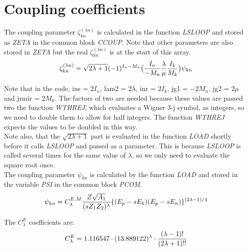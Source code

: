 \chapter{Coupling coefficients}
\label{chapt:coupling}

The coupling parameter $\zeta_{kn}^{(\lambda n)}$ is calculated in the
function \emph{LSLOOP} and stored as \emph{ZETA} in the common block \emph{
CCOUP}. Note that other parameters are also stored in \emph{ZETA} but the
real $\zeta_{kn}^{(\lambda n)}$ is at the start of this array.\\

\begin{equation}
\zeta_{kn}^{(\lambda n)} =
\sqrt{2 \lambda + 1}
(-1)^{I_n - M_n}
\big({I_n \over -M_n} {\lambda \over \mu} {I_k \over M_k}\big)
\psi_{kn}
\end{equation}

Note that in the code, ins = $2I_n$, lam2 = $2\lambda$, inr = $2I_k$, jg1 =
$-2M_n$, jg2 = $2\mu$ and jrmir = $2M_k$. The factors of two are needed
because these values are passed two the function \emph{WTHREJ}, which
evaluates a Wigner 3-j symbol, as integers, so we need to double them to
allow for half integers. The function \emph{WTHREJ} expects the values to be
doubled in this way.\\

Note also, that the $\sqrt{2 \lambda + 1}$ part is evaluated in the function
\emph{LOAD} shortly before it calls \emph{LSLOOP} and passed as a parameter.
This is because \emph{LSLOOP} is called several times for the same value of
$\lambda$, so we only need to evaluate the square root once.\\

The coupling parameter $\psi_{kn}$ is calculated by the function \emph{LOAD}
and stored in the variable \emph{PSI} in the common block \emph{PCOM}.\\

\begin{equation}
\psi_{kn} = 
C_\lambda^{E,M}
{Z \sqrt{A_1} \over (s Z_1 Z_2)^\lambda}
\{(E_p - s E_k)(E_p - s E_n)\}^{(2 \lambda - 1) / 4}
\end{equation}

The $C_\lambda^{E}$ coefficients are:\\

\begin{equation}
C_\lambda^E = 1.116547 \cdot (13.889122)^\lambda \cdot
{(\lambda - 1)! \over (2 \lambda + 1)!!}
\end{equation}

